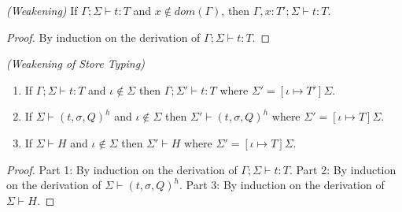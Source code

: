 \begin{lem}
\emph{(Weakening)}\label{lem:weakening}
If $\Gamma ; \Sigma \vdash t : T$ and $x \notin dom(\Gamma)$, then
$\Gamma , x : T' ; \Sigma \vdash t : T$.
\end{lem}
\begin{proof}
By induction on the derivation of $\Gamma ; \Sigma \vdash t : T$.
\end{proof}

\begin{lem}
\emph{(Weakening of Store Typing)}\label{lem:weakening-store-typing}
\begin{enumerate}
\item If $\Gamma ; \Sigma \vdash t : T$ and $\iota \notin \Sigma$ then $\Gamma ; \Sigma' \vdash t : T$ where $\Sigma' = [\iota \mapsto T']\Sigma$.
\item If $\Sigma \vdash (t, \sigma, Q)^h$ and $\iota \notin \Sigma$ then $\Sigma' \vdash (t, \sigma, Q)^h$ where $\Sigma' = [\iota \mapsto T]\Sigma$.
\item If $\Sigma \vdash H$ and $\iota \notin \Sigma$ then $\Sigma' \vdash H$ where $\Sigma' = [\iota \mapsto T]\Sigma$.
\end{enumerate}
\end{lem}
\begin{proof}
Part 1: By induction on the derivation of $\Gamma ; \Sigma \vdash t : T$. Part 2: By induction on the derivation of $\Sigma \vdash (t, \sigma, Q)^h$. Part 3: By induction on the derivation of $\Sigma \vdash H$.
\end{proof}

